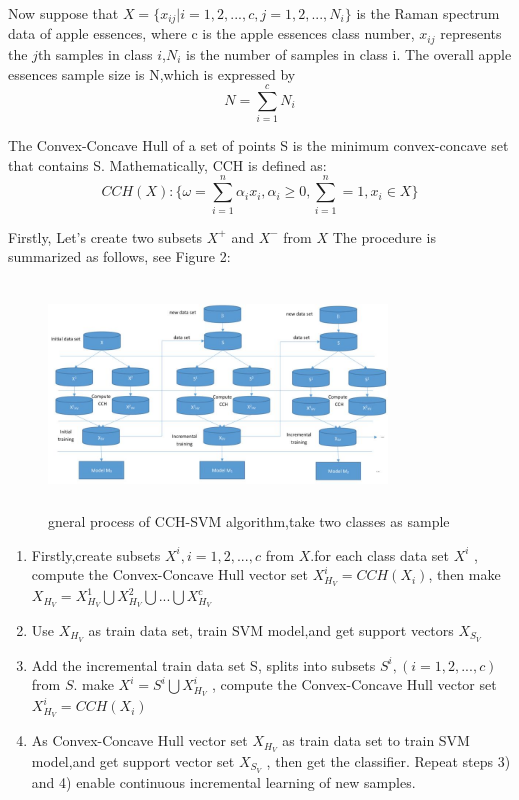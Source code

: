 \documentclass[a4paper]{article}
\begin{document}
Now suppose that $X =\{x_{ij} | i = 1,2,...,c,j=1,2,...,N_i\}$ is the Raman spectrum data of  apple essences, where c is the apple essences class number, $x_{ij}$ represents the $j$th samples in class $i$,$N_i$ is the number of samples in class i. The overall apple essences sample size is N,which is expressed by
$$N = \sum _{i=1} ^{c} N_i$$

The Convex-Concave Hull of a set of points S is the minimum convex-concave set that contains S. Mathematically, CCH is defined as:
$$
CCH(X) :\{ \omega = \sum_{i=1} ^{n} \alpha_i x_i, \alpha_i \geq 0, \sum_{i=1} ^{n} = 1, x_i \in X \}
$$

Firstly, Let's create two subsets $X^+$ and $X^-$ from $X$
The procedure is summarized as follows, see Figure 2:
\begin{figure}[h]
  \centering
  \includegraphics[width=9cm,height=6cm]{CCH-SVM}
  \caption{gneral process of CCH-SVM algorithm,take two classes as sample}
\end{figure}

\begin{enumerate}
\item Firstly,create subsets $X^i, i= 1,2,...,c$ from $X$.for each class data set $X^{i}$ , compute the Convex-Concave Hull vector set $X ^{i}_{H_{V}} = CCH(X_i)$, then make  $ X_{H_{V}} =X ^{1}_{H_{V}}  \bigcup X ^{2}_{H_{V}} \bigcup ...\bigcup X ^{c}_{H_{V}} $

\item Use $X_{H_{V}}$ as train data set, train SVM model,and get support vectors $X_{S_{V}}$

\item Add the incremental train data set S, splits into subsets $S^i ,( i= 1,2,...,c)$ from $S$.
make $X^i = S^i \bigcup X^i _{H_{V}}$ , compute the Convex-Concave Hull vector set $X ^{i}_{H_{V}} = CCH(X_i)$

\item As Convex-Concave Hull vector set $X_{H_{V}}$ as train data set to train SVM model,and get support vector set $X_{S_{V}}$ , then get the classifier.
Repeat steps 3) and 4) enable continuous incremental learning of new samples.
\end{enumerate}
\end{document}
